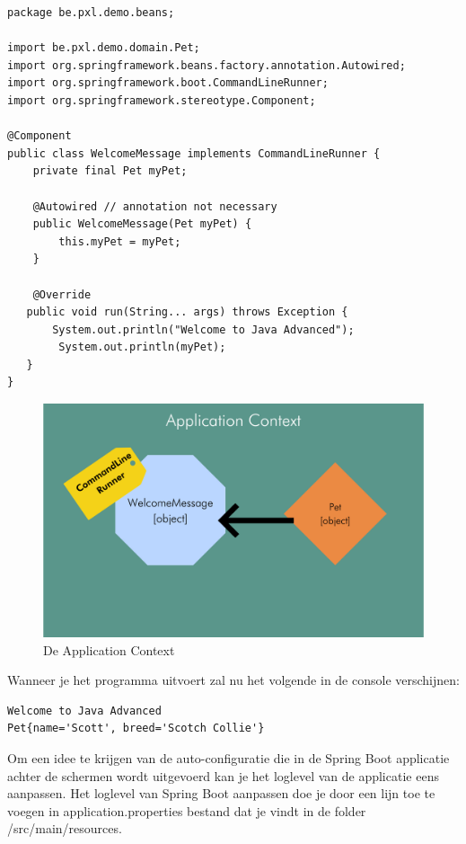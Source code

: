 \begin{lstlisting}
package be.pxl.demo.beans;

import be.pxl.demo.domain.Pet;
import org.springframework.beans.factory.annotation.Autowired;
import org.springframework.boot.CommandLineRunner;
import org.springframework.stereotype.Component;

@Component
public class WelcomeMessage implements CommandLineRunner {
	private final Pet myPet;

	@Autowired // annotation not necessary
	public WelcomeMessage(Pet myPet) {
		this.myPet = myPet;
	}

	@Override
   public void run(String... args) throws Exception {
	   System.out.println("Welcome to Java Advanced");
		System.out.println(myPet);
   }
}
\end{lstlisting}

\begin{figure}[H]
  \includegraphics[width=\linewidth]{images/chapter1/application_context_with_pet.png}
  \caption{De Application Context}
  \label{fig:application_context}
\end{figure}

Wanneer je het programma uitvoert zal nu het volgende in de console verschijnen:
\begin{verbatim}
Welcome to Java Advanced
Pet{name='Scott', breed='Scotch Collie'}
\end{verbatim}

Om een idee te krijgen van de auto-configuratie die in de Spring Boot applicatie achter de schermen wordt uitgevoerd kan je het loglevel van de applicatie eens aanpassen.
Het loglevel van Spring Boot aanpassen doe je door een lijn toe te voegen in application.properties bestand dat je vindt in de folder /src/main/resources. 

